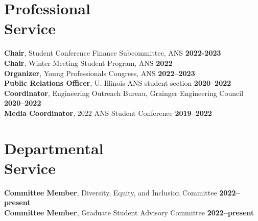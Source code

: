 \documentclass[margin,line]{resume}
\begin{document}
\begin{resume}
    \section{\mysidestyle Professional\\Service}
    \textbf{Chair}, Student Conference Finance Subcommittee, ANS \hfill \textbf{2022-2023}\vspace{.5mm}\\%
                \textbf{Chair}, Winter Meeting Student Program, ANS \hfill \textbf{2022}\vspace{.5mm}\\%
    \textbf{Organizer}, Young Professionals Congress, ANS \hfill \textbf{2022--2023}\vspace{.5mm}\\%
                \textbf{Public Relations Officer}, U. Illinois ANS student section  \hfill \textbf{2020--2022}\vspace{.5mm}\\%
    \textbf{Coordinator}, Engineering Outreach Bureau, Grainger Engineering Council \hfill \textbf{2020--2022}\vspace{.5mm}\\%
                \textbf{Media Coordinator}, 2022 ANS Student Conference \hfill \textbf{2019--2022}\vspace{.5mm}\\%
    \section{\mysidestyle Departmental\\Service}
                \textbf{Committee Member}, Diversity, Equity, and Inclusion Committee \hfill \textbf{2022--present}\vspace{.5mm}\\%
                \textbf{Committee Member}, Graduate Student Advisory Committee \hfill \textbf{2022--present}\vspace{.5mm}\\%
    

\end{resume}
\end{document}
